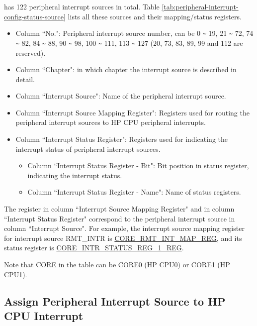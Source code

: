 \documentclass[main\_\_EN.tex]{subfiles}
\begin{document}
\chipname{} has 122 peripheral interrupt sources in total. Table \ref{tab:peripheral-interrupt-config-status-source} lists all these sources and their mapping/status registers.


\begin{itemize}
    \item Column ``No.": Peripheral interrupt source number, can be 0 \verb+~+ 19, 21 \verb+~+ 72, 74 \verb+~+ 82, 84 \verb+~+ 88, 90 \verb+~+ 98, 100 \verb+~+ 111, 113 \verb+~+ 127 (20, 73, 83, 89, 99 and 112 are reserved).
    \item Column ``Chapter": in which chapter the interrupt source is described in detail.
    \item Column ``Interrupt Source": Name of the peripheral interrupt source.
    \item Column ``Interrupt Source Mapping Register": Registers used for routing the peripheral interrupt sources to HP CPU peripheral interrupts.
    \item Column ``Interrupt Status Register": Registers used for indicating the interrupt status of peripheral interrupt sources.
    \begin{itemize}
        \item Column ``Interrupt Status Register - Bit": Bit position in status register, indicating the interrupt status.
        \item Column ``Interrupt Status Register - Name": Name of status registers.
    \end{itemize}
\end{itemize}

The register in column ``Interrupt Source Mapping Register" and in column ``Interrupt Status Register" correspond to the peripheral interrupt source in column ``Interrupt Source". For example, the interrupt source mapping register for interrupt source RMT\_INTR is \hyperref[regdesc:CORE0RMTINTMAPREG]{CORE\_RMT\_INT\_MAP\_REG}, and its status register is \hyperref[regdesc:CORE0INTRSTATUSREG1REG]{CORE\_INTR\_STATUS\_REG\_1\_REG}.

Note that CORE in the table can be CORE0 (HP CPU0) or CORE1 (HP CPU1).

\clearpage
\begin{landscape}

\end{landscape}
\restoregeometry
\clearpage


\subsection{Assign Peripheral Interrupt Source to HP CPU Interrupt}
\end{document}
